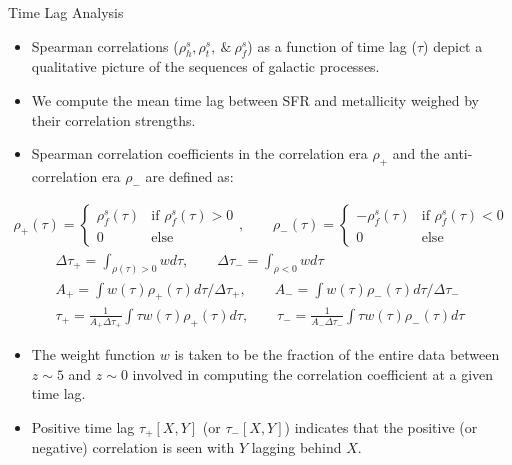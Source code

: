 \documentclass[11pt]{beamer}
\begin{document}
\begin{frame}{Time Lag Analysis}
    \small
    \begin{itemize}
        \item Spearman correlations ($\rho^s_h, \rho^s_t, ~\&~ \rho^s_f$) as a function of time lag ($\tau$) depict a qualitative picture of the sequences of galactic processes.
        \item We compute the mean time lag between SFR and metallicity weighed by their correlation strengths.
        \item Spearman correlation coefficients in the correlation era $\rho_{+}$ and the anti-correlation era $\rho_{-}$ are defined as:
    \end{itemize}
    \begin{gather*}
    \rho_{+}(\tau) = 
    \begin{cases} 
    \rho^s_f(\tau) & \text{if } \rho^s_f(\tau) > 0 \\ 
    0 & \text{else} 
    \end{cases}, \qquad
    \rho_{-}(\tau) = 
    \begin{cases} 
    -\rho^s_f(\tau) & \text{if } \rho^s_f(\tau) < 0 \\
    0 & \text{else} 
    \end{cases}
    \end{gather*}
    \begin{gather*}
    \Delta\tau_{+} = \int_{\rho(\tau)>0} w d\tau , \qquad \Delta\tau_{-} = \int_{\rho<0} w d\tau   \\
    A_{+} = \int w(\tau) \rho_{+}(\tau) d\tau / \Delta\tau_{+}, \qquad A_{-} = \int w(\tau) \rho_{-}(\tau) d\tau / \Delta\tau_{-} \\
    \tau_{+} = \frac{1}{A_{+} \Delta\tau_{+}} \int \tau w(\tau) \rho_{+}(\tau) d\tau , \qquad \tau_{-} = \frac{1}{A_{-}\Delta\tau_{-}} \int \tau w(\tau) \rho_{-}(\tau) d\tau     
    \end{gather*}
    \begin{itemize}
        \item The weight function $w$ is taken to be the fraction of the entire data between $z \sim 5$ and $z \sim 0$ involved in computing the correlation coefficient at a given time lag.
        \item Positive time lag $\tau_{+}[X,Y]$ (or $\tau_{-}[X,Y]$) indicates that the positive (or negative) correlation is seen with $Y$ lagging behind $X$.
    \end{itemize}
\end{frame}
\end{document}
